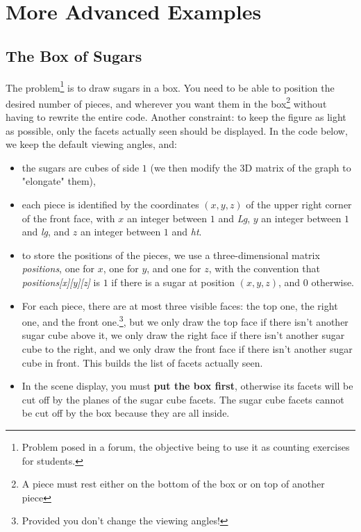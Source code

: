 \section{More Advanced Examples}

\subsection{The Box of Sugars}

The problem\footnote{Problem posed in a forum, the objective being to use it as counting exercises for students.} is to draw sugars in a box. You need to be able to position the desired number of pieces, and wherever you want them in the box\footnote{A piece must rest either on the bottom of the box or on top of another piece} without having to rewrite the entire code. Another constraint: to keep the figure as light as possible, only the facets actually seen should be displayed. In the code below, we keep the default viewing angles, and:
\begin{itemize}
    \item the sugars are cubes of side $1$ (we then modify the 3D matrix of the graph to "elongate" them),
    \item each piece is identified by the coordinates $(x,y,z)$ of the upper right corner of the front face, with $x$ an integer between $1$ and \emph{Lg}, $y$ an integer between $1$ and \emph{lg}, and $z$ an integer between $1$ and \emph{ht}.
    \item to store the positions of the pieces, we use a three-dimensional matrix \emph{positions}, one for $x$, one for $y$, and one for $z$, with the convention that \emph{positions[x][y][z]} is $1$ if there is a sugar at position $(x,y,z)$, and $0$ otherwise.
     \item For each piece, there are at most three visible faces: the top one, the right one, and the front one.\footnote{Provided you don't change the viewing angles!}, but we only draw the top face if there isn't another sugar cube above it, we only draw the right face if there isn't another sugar cube to the right, and we only draw the front face if there isn't another sugar cube in front. This builds the list of facets actually seen.
    \item In the scene display, you must \textbf{put the box first}, otherwise its facets will be cut off by the planes of the sugar cube facets. The sugar cube facets cannot be cut off by the box because they are all inside.
\end{itemize}

